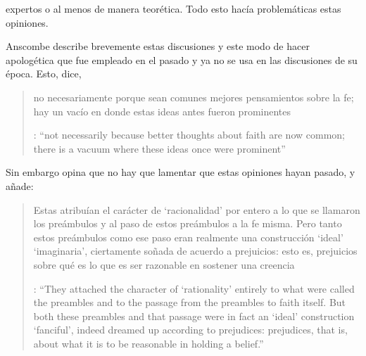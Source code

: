 expertos o al menos de manera teorética. Todo esto hacía problemáticas estas opiniones.

Anscombe describe brevemente estas discusiones y este modo de hacer apologética que fue empleado en el pasado y ya no se usa en las discusiones de su época. Esto, dice, \blockquote[{\cite[114]{anscombe1981erp:faith}}: \enquote{not necessarily because better thoughts about faith are now common; there is a vacuum where these ideas once were prominent}]{no necesariamente porque sean comunes mejores pensamientos sobre la fe; hay un vacío en donde estas ideas antes fueron prominentes}. Sin embargo opina que no hay que lamentar que estas opiniones hayan pasado, y añade: \blockquote[{\cite[114]{anscombe1981erp:faith}}: \enquote{They attached the character of `rationality' entirely to what were called the preambles and to the passage from the preambles to faith itself. But both these preambles and that passage were in fact an `ideal' construction \textelp{} `fanciful', indeed dreamed up according to prejudices: prejudices, that is, about what it is to be reasonable in holding a belief.}]{Estas atribuían el carácter de `racionalidad' por entero a lo que se llamaron los preámbulos y al paso de estos preámbulos a la fe misma. Pero tanto estos preámbulos como ese paso eran realmente una construcción `ideal' \textelp{} `imaginaria', ciertamente soñada de acuerdo a prejuicios: esto es, prejuicios sobre qué es lo que es ser razonable en sostener una creencia}.

